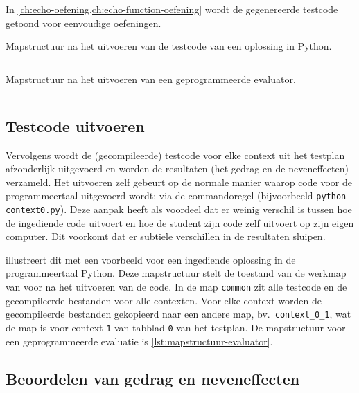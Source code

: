 In \cref{ch:echo-oefening,ch:echo-function-oefening} wordt de gegenereerde testcode getoond voor eenvoudige oefeningen.

\begin{listing}
    \caption{Mapstructuur na het uitvoeren van de testcode van een oplossing in Python.}
    \label{lst:mapstructuur}
    \inputminted{text}{code/dirs-python-solution.txt}
\end{listing}

\begin{listing}
    \caption{Mapstructuur na het uitvoeren van een geprogrammeerde evaluator.}
    \label{lst:mapstructuur-evaluator}
    \inputminted{text}{code/dirs-python-eval.txt}
\end{listing}

\subsection{Testcode uitvoeren}\label{subsec:testcode-uitvoeren}

Vervolgens wordt de (gecompileerde) testcode voor elke context uit het testplan afzonderlijk uitgevoerd en worden de resultaten (het gedrag en de neveneffecten) verzameld.
Het uitvoeren zelf gebeurt op de normale manier waarop code voor de programmeertaal uitgevoerd wordt: via de commandoregel (bijvoorbeeld \texttt{python context0.py}).
Deze aanpak heeft als voordeel dat er weinig verschil is tussen hoe \tested{} de ingediende code uitvoert en hoe de student zijn code zelf uitvoert op zijn eigen computer.
Dit voorkomt dat er subtiele verschillen in de resultaten sluipen.

 illustreert dit met een voorbeeld voor een ingediende oplossing in de programmeertaal Python.
Deze mapstructuur stelt de toestand van de werkmap van \tested{} voor na het uitvoeren van de code.
In de map \texttt{common} zit alle testcode en de gecompileerde bestanden voor alle contexten.
Voor elke context worden de gecompileerde bestanden gekopieerd naar een andere map, bv.\ \texttt{context\_0\_1}, wat de map is voor context \texttt{1} van tabblad \texttt{0} van het testplan.
De mapstructuur voor een geprogrammeerde evaluatie is \cref{lst:mapstructuur-evaluator}.

\subsection{Beoordelen van gedrag en neveneffecten}\label{subsec:beoordelen-van-gedrag}

